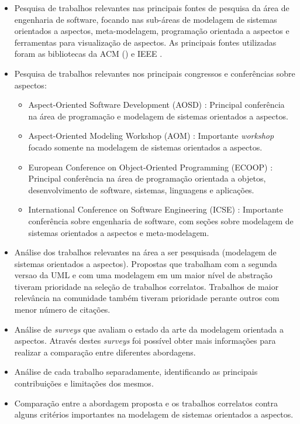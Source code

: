 \begin{itemize}
  \item Pesquisa de trabalhos relevantes nas principais fontes de pesquisa da área de engenharia de software, focando nas sub-áreas de
  modelagem de sistemas orientados a aspectos, meta-modelagem, programação orientada a aspectos e ferramentas para visualização de aspectos. As
  principais fontes utilizadas foram as bibliotecas da ACM (\cite{acm}) e IEEE \cite{ieee}.
  \item Pesquisa de trabalhos relevantes nos principais congressos e conferências sobre aspectos:
  \begin{itemize}
    \item Aspect-Oriented Software Development (AOSD) \cite{aosd}: Principal conferência na área de programação e modelagem de sistemas orientados a
    aspectos.
    \item Aspect-Oriented Modeling Workshop (AOM) \cite{aom}: Importante \textit{workshop} focado somente na modelagem de sistemas orientados a
    aspectos.
    \item European Conference on Object-Oriented Programming (ECOOP) \cite{ecoop}: Principal conferência na área de programação orientada a objetos,
    desenvolvimento de software, sistemas, linguagens e aplicações.
    \item International Conference on Software Engineering (ICSE) \cite{icse}: Importante conferência sobre engenharia de software, com seções sobre
    modelagem de sistemas orientados a aspectos e meta-modelagem.
  \end{itemize}
  \item Análise dos trabalhos relevantes na área a ser pesquisada (modelagem de sistemas orientados a aspectos). Propostas que trabalham
  com a segunda versao da UML e com uma modelagem em um maior nível de abstração tiveram prioridade na seleção de trabalhos correlatos. Trabalhos de
  maior relevância na comunidade também tiveram prioridade perante outros com menor número de citações. 
  \item Análise de \textit{surveys} que avaliam o estado da arte da modelagem orientada a aspectos. Através destes \textit{surveys} foi
  possível obter mais informações para realizar a comparação entre diferentes abordagens.
  \item Análise de cada trabalho separadamente, identificando as principais contribuições e limitações dos mesmos.
  \item Comparação entre a abordagem proposta e os trabalhos correlatos contra alguns critérios importantes na modelagem de sistemas orientados a
  aspectos.
\end{itemize}

